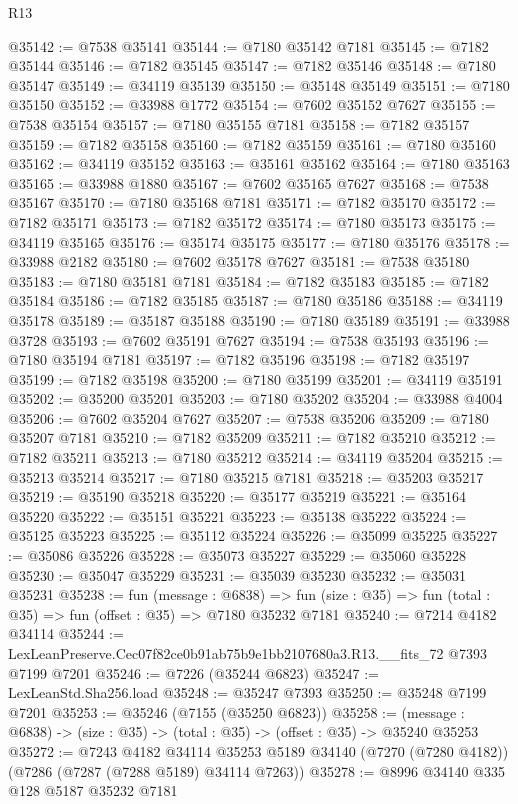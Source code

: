 \begin{lexlean}{R13}
\begin{coremodule}
@35142 := @7538 @35141
@35144 := @7180 @35142 @7181
@35145 := @7182 @35144
@35146 := @7182 @35145
@35147 := @7182 @35146
@35148 := @7180 @35147
@35149 := @34119 @35139
@35150 := @35148 @35149
@35151 := @7180 @35150
@35152 := @33988 @1772
@35154 := @7602 @35152 @7627
@35155 := @7538 @35154
@35157 := @7180 @35155 @7181
@35158 := @7182 @35157
@35159 := @7182 @35158
@35160 := @7182 @35159
@35161 := @7180 @35160
@35162 := @34119 @35152
@35163 := @35161 @35162
@35164 := @7180 @35163
@35165 := @33988 @1880
@35167 := @7602 @35165 @7627
@35168 := @7538 @35167
@35170 := @7180 @35168 @7181
@35171 := @7182 @35170
@35172 := @7182 @35171
@35173 := @7182 @35172
@35174 := @7180 @35173
@35175 := @34119 @35165
@35176 := @35174 @35175
@35177 := @7180 @35176
@35178 := @33988 @2182
@35180 := @7602 @35178 @7627
@35181 := @7538 @35180
@35183 := @7180 @35181 @7181
@35184 := @7182 @35183
@35185 := @7182 @35184
@35186 := @7182 @35185
@35187 := @7180 @35186
@35188 := @34119 @35178
@35189 := @35187 @35188
@35190 := @7180 @35189
@35191 := @33988 @3728
@35193 := @7602 @35191 @7627
@35194 := @7538 @35193
@35196 := @7180 @35194 @7181
@35197 := @7182 @35196
@35198 := @7182 @35197
@35199 := @7182 @35198
@35200 := @7180 @35199
@35201 := @34119 @35191
@35202 := @35200 @35201
@35203 := @7180 @35202
@35204 := @33988 @4004
@35206 := @7602 @35204 @7627
@35207 := @7538 @35206
@35209 := @7180 @35207 @7181
@35210 := @7182 @35209
@35211 := @7182 @35210
@35212 := @7182 @35211
@35213 := @7180 @35212
@35214 := @34119 @35204
@35215 := @35213 @35214
@35217 := @7180 @35215 @7181
@35218 := @35203 @35217
@35219 := @35190 @35218
@35220 := @35177 @35219
@35221 := @35164 @35220
@35222 := @35151 @35221
@35223 := @35138 @35222
@35224 := @35125 @35223
@35225 := @35112 @35224
@35226 := @35099 @35225
@35227 := @35086 @35226
@35228 := @35073 @35227
@35229 := @35060 @35228
@35230 := @35047 @35229
@35231 := @35039 @35230
@35232 := @35031 @35231
@35238 := fun (message : @6838) =>
  fun (size : @35) => fun (total : @35) => fun (offset : @35) => @7180 @35232 @7181
@35240 := @7214 @4182 @34114
@35244 := LexLeanPreserve.Cec07f82ce0b91ab75b9e1bb2107680a3.R13.__fits_72 @7393 @7199 @7201
@35246 := @7226 (@35244 @6823)
@35247 := LexLeanStd.Sha256.load
@35248 := @35247 @7393
@35250 := @35248 @7199 @7201
@35253 := @35246 (@7155 (@35250 @6823))
@35258 := (message : @6838) -> (size : @35) -> (total : @35) -> (offset : @35) -> @35240 @35253
@35272 := @7243
    @4182
    @34114
    @35253
    @5189
    @34140
    (@7270 (@7280 @4182))
    (@7286 (@7287 (@7288 @5189) @34114 @7263))
@35278 := @8996 @34140 @335 @128 @5187 @35232 @7181

\end{coremodule}
\end{lexlean}
